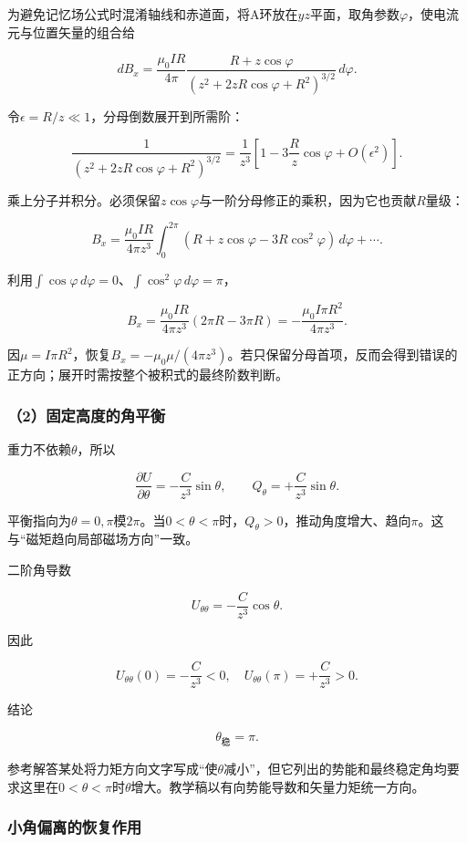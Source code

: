 \documentclass[12pt,a4paper,fontset=fandol]{ctexart}
\begin{document}
为避免记忆场公式时混淆轴线和赤道面，将A环放在\(yz\)平面，取角参数\(\varphi\)，使电流元与位置矢量的组合给

\[
dB_x=\frac{\mu_0IR}{4\pi}
\frac{R+z\cos\varphi}
{(z^2+2zR\cos\varphi+R^2)^{3/2}}\,d\varphi.
\]

令\(\epsilon=R/z\ll1\)，分母倒数展开到所需阶：

\[
\frac1{(z^2+2zR\cos\varphi+R^2)^{3/2}}
=\frac1{z^3}
\left[1-3\frac Rz\cos\varphi+O(\epsilon^2)\right].
\]

乘上分子并积分。必须保留\(z\cos\varphi\)与一阶分母修正的乘积，因为它也贡献\(R\)量级：

\[
B_x=\frac{\mu_0IR}{4\pi z^3}
\int_0^{2\pi}(R+z\cos\varphi-3R\cos^2\varphi)\,d\varphi+\cdots.
\]

利用\(\int\cos\varphi\,d\varphi=0\)、\(\int\cos^2\varphi\,d\varphi=\pi\)，

\[
B_x=\frac{\mu_0IR}{4\pi z^3}(2\pi R-3\pi R)
=-\frac{\mu_0I\pi R^2}{4\pi z^3}.
\]

因\(\mu=I\pi R^2\)，恢复\(B_x=-\mu_0\mu/(4\pi z^3)\)。若只保留分母首项，反而会得到错误的正方向；展开时需按整个被积式的最终阶数判断。

\subsubsection{（2）固定高度的角平衡}\label{ux56faux5b9aux9ad8ux5ea6ux7684ux89d2ux5e73ux8861}

重力不依赖\(\theta\)，所以

\[
\frac{\partial U}{\partial\theta}
=-\frac C{z^3}\sin\theta,
\qquad
Q_\theta=+\frac C{z^3}\sin\theta.
\]

平衡指向为\(\theta=0,\pi\)模\(2\pi\)。当\(0<\theta<\pi\)时，\(Q_\theta>0\)，推动角度增大、趋向\(\pi\)。这与``磁矩趋向局部磁场方向''一致。

二阶角导数

\[
U_{\theta\theta}=-\frac C{z^3}\cos\theta.
\]

因此

\[
U_{\theta\theta}(0)=-\frac C{z^3}<0,
\quad
U_{\theta\theta}(\pi)=+\frac C{z^3}>0.
\]

结论

\[
\boxed{\theta_{\text{稳}}=\pi}.
\]

参考解答某处将力矩方向文字写成``使\(\theta\)减小''，但它列出的势能和最终稳定角均要求这里在\(0<\theta<\pi\)时\(\theta\)增大。教学稿以有向势能导数和矢量力矩统一方向。

\subsubsection{小角偏离的恢复作用}\label{ux5c0fux89d2ux504fux79bbux7684ux6062ux590dux4f5cux7528}
\end{document}
